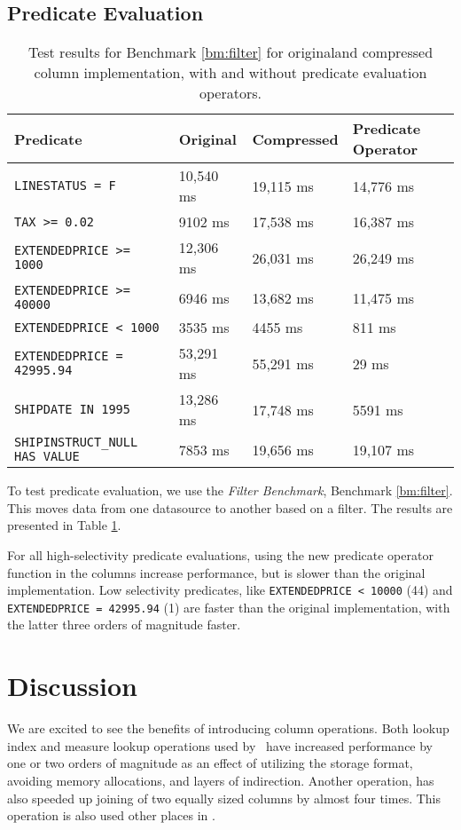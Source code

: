 \subsection{Predicate Evaluation}
\label{sub:Predicate Evaluation}
\begin{table}
    \centering
    \begin{tabularx}{\textwidth}{X | X X X}
        Predicate & Original & Compressed & Predicate Operator \\
        \hline
        \hline
        \texttt{LINESTATUS = F} & 10,540 ms & 19,115 ms & 14,776 ms\\
        \texttt{TAX >= 0.02} & 9102 ms & 17,538 ms & 16,387 ms \\
        \texttt{EXTENDEDPRICE >= 1000} & 12,306 ms & 26,031 ms & 26,249 ms \\
        \texttt{EXTENDEDPRICE >= 40000} & 6946 ms & 13,682 ms & 11,475 ms \\
        \texttt{EXTENDEDPRICE < 1000} & 3535 ms & 4455 ms & 811 ms \\
        \texttt{EXTENDEDPRICE = 42995.94} & 53,291 ms & 55,291 ms & 29 ms \\
        \texttt{SHIPDATE IN 1995} & 13,286 ms & 17,748 ms & 5591 ms \\
        \texttt{SHIPINSTRUCT\_NULL HAS VALUE} & 7853 ms & 19,656 ms & 19,107 ms 
    \end{tabularx}
    \caption{Test results for Benchmark \ref{bm:filter} for originaland compressed column implementation, with and without predicate evaluation operators.}
    \label{tab:operations-filter}
\end{table}
To test predicate evaluation, we use the \textit{Filter Benchmark}, Benchmark \ref{bm:filter}. This moves data from one datasource to another based on a filter. The results are presented in Table \ref{tab:operations-filter}.

For all high-selectivity predicate evaluations, using the new predicate operator function in the columns increase performance, but is slower than the original implementation. Low selectivity predicates, like \texttt{EXTENDEDPRICE < 10000} (44) and \texttt{EXTENDEDPRICE = 42995.94} (1) are faster than the original implementation, with the latter three orders of magnitude faster.

\section{Discussion}
\label{sec:Discussion}
We are excited to see the benefits of introducing column operations. Both lookup index and measure lookup operations used by \gd~have increased performance by one or two orders of magnitude as an effect of utilizing the storage format, avoiding memory allocations, and layers of indirection. Another operation,  has also speeded up joining of two equally sized columns by almost four times. This operation is also used other places in \gap.

